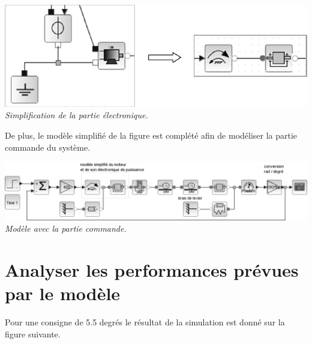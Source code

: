 \documentclass[10pt,fleqn]{article} %
\begin{document}
\begin{multicols}{2}
\begin{center}
\includegraphics[width=.95\linewidth]{images/fig_07}
\textit{Simplification de la partie électronique. }
\end{center}


De plus, le modèle simplifié de la figure est complété afin de modéliser la partie commande du système.%

\begin{center}
\includegraphics[width=.95\linewidth]{images/fig_08}
\textit{Modèle avec la partie commande.}
\end{center}
%



\section*{Analyser les performances prévues par le modèle\\} 

Pour une consigne de \num{5.5} degrés le résultat de la simulation est donné sur la figure suivante.%



\end{multicols}
\end{document}
